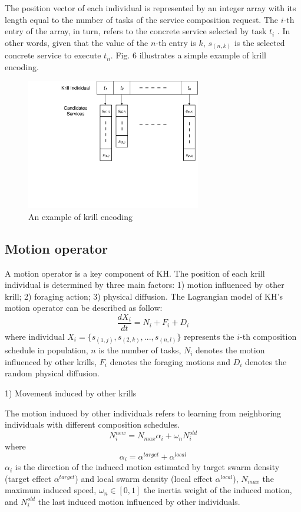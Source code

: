\documentclass[journal]{IEEEtran}
\begin{document}
The position vector of each individual is represented by an integer array with its length equal to the number of tasks of the service composition request. The $i$-th entry of the array, in turn, refers to the concrete service selected by task $t_i$ . In other words, given that the value of the $n$-th entry is $k$, $s_{(n,k)}$ is the selected concrete service to execute $t_n$. Fig. 6 illustrates a simple example of  krill encoding.

\begin{figure}[!t]
\centering
\includegraphics[width=3in]{./img/pic6.pdf}
\caption{An example of krill encoding}
\label{Krill encoding}
\end{figure}

\subsection{Motion operator}

A motion operator is a key component of KH. The position of each krill individual is determined by three main factors: 1) motion influenced by other krill; 2) foraging action; 3) physical diffusion. The Lagrangian model of KH's motion operator can be described as follow:
\begin{equation}
\frac{dX_i}{dt} =N_i+F_i+D_i
\end{equation}
where individual $X_i = \{s_{(1,j)}, s_{(2,k)}, . . . , s_{(n,l)}\}$ represents the $i$-th composition schedule in population, $n$ is the number of tasks, $N_i$ denotes the motion influenced by other krills, $F_i$ denotes the foraging motions and $D_i$ denotes the random physical diffusion.


1) Movement induced by other krills

The motion induced by other individuals refers to learning from neighboring individuals with different composition schedules.
\begin{equation}
N^{new}_i = N_{max}\alpha_i + \omega_n N^{old}_i
\end{equation}
where
\begin{equation}
\alpha_i = \alpha^{target} + \alpha^{local}
\end{equation}
$\alpha_i$ is the direction of the induced motion estimated by target swarm density (target effect $\alpha^{target}$) and local swarm density (local effect $\alpha^{local}$), $N_{max}$ the maximum induced speed, $\omega_n \in [0, 1]$ the inertia weight of the induced motion, and $N^{old}_{i}$ the last induced motion influenced by other individuals.
\end{document}
